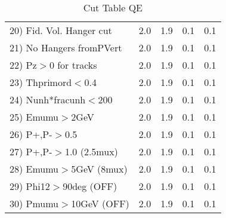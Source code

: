 \begin{table}[h!]
\begin{tabular}{||l||r|r|r|r||}
 20) Fid. Vol. Hanger cut &         2.0 &         1.9 &         0.1 &         0.1 \\
 21) No Hangers fromPVert &         2.0 &         1.9 &         0.1 &         0.1 \\
 22) Pz$>$0 for tracks    &         2.0 &         1.9 &         0.1 &         0.1 \\
 23) Thprimord$<$0.4      &         2.0 &         1.9 &         0.1 &         0.1 \\
 24) Nunh*fracunh$<$200   &         2.0 &         1.9 &         0.1 &         0.1 \\
 25) Emumu$>$2GeV         &         2.0 &         1.9 &         0.1 &         0.1 \\
 26) P+,P-$>$0.5          &         2.0 &         1.9 &         0.1 &         0.1 \\
 27) P+,P-$>$1.0 (2.5mux) &         2.0 &         1.9 &         0.1 &         0.1 \\
 28) Emumu$>$5GeV  (8mux) &         2.0 &         1.9 &         0.1 &         0.1 \\
 29) Phi12$>$90deg  (OFF) &         2.0 &         1.9 &         0.1 &         0.1 \\
 30) Pmumu$>$10GeV  (OFF) &         2.0 &         1.9 &         0.1 &         0.1 \\
 \hline
 \hline
 \end{tabular}
 \caption{Cut Table  QE     }
 \label{tab-cut____qe}
 \end{table}

